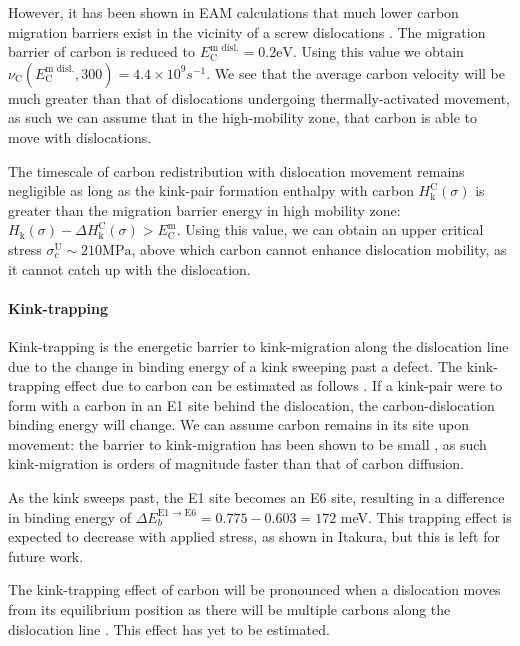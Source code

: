 \documentclass[a4paper,11pt]{article}
\numberwithin{equation}{chapter}
\numberwithin{listing}{chapter}
\begin{document}
However, it has been shown in EAM calculations that much lower carbon migration
barriers exist in the vicinity of a screw dislocations \cite{Nematollahi2016}. The
migration barrier of carbon is reduced to \(E^{\text{m disl.}}_{\text{C}} = 0.2
   \text{eV}\). Using this value we obtain \(\nu_{\text{C}}(E^{\text{m
   disl.}}_{\text{C}}, 300) = 4.4 \times 10^{9} s^{-1}\). We see that the average carbon velocity
will be much greater than that of dislocations undergoing thermally-activated movement, as
such we can assume that in the high-mobility zone, that carbon is able to move with
dislocations.


The timescale of carbon redistribution with dislocation movement remains negligible as
long as the kink-pair formation enthalpy with carbon \(H_{\text{k}}^{\text{C}}(\sigma)\)
is greater than the migration barrier energy in high mobility zone:
\(H_{\text{k}}(\sigma) - \Delta H_{\text{k}}^{\text{C}}(\sigma) >
   E^{\text{m}}_{\text{C}}\). Using this value, we can obtain an upper critical stress
\(\sigma^{\text{U}}_c \sim 210 \text{MPa}\), above which carbon cannot enhance
dislocation mobility, as it cannot catch up with the dislocation.

\paragraph{Kink-trapping}
\label{sec:org35a55ec}

Kink-trapping is the energetic barrier to kink-migration along the dislocation line
due to the change in binding energy of a kink sweeping past a defect. The
kink-trapping effect due to carbon can be estimated as follows
\cite{itakura13_effec_hydrog_atoms_screw_disloc}. If a
kink-pair were to form with a carbon in an E1 site behind the dislocation, the carbon-dislocation binding
energy will change. We can assume carbon remains in its
site upon movement: the barrier to kink-migration has been shown to be small
\cite{itakura13_effec_hydrog_atoms_screw_disloc,Simpson2019,Gong2020}, as such kink-migration is
orders of magnitude faster than that of carbon diffusion.

As the kink sweeps past, the E1 site becomes an E6 site, resulting in a
difference in binding energy of \(\Delta E_b^{\text{E}1\rightarrow
     \text{E}6} = 0.775 - 0.603 = 172\) meV. This trapping effect is expected to
decrease with applied stress, as shown in Itakura, but this is left for
future work.

The kink-trapping effect of carbon will be pronounced when a dislocation
moves from its equilibrium position as there will be multiple carbons along
the dislocation line \cite{Luthi2019}. This effect has yet to be estimated.
\end{document}
